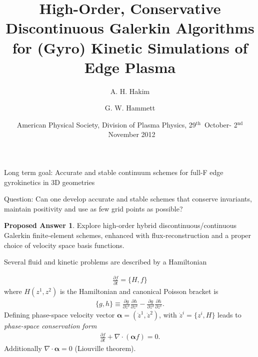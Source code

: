 \documentclass[pdf]{beamer}
\title[Continuum Discontinuous Galerkin Algorithms]{High-Order,
  Conservative Discontinuous Galerkin Algorithms for (Gyro) Kinetic
  Simulations of Edge Plasma}%
\author{A. H. Hakim \and G. W. Hammett}%
\institute[http://www.ammar-hakim.org/sj] %
{
  Princeton Plasma Physics Laboratory, Princeton, NJ\\
  ammar@princeton.edu\\
  \url{http://www.ammar-hakim.org}
}
\date[APS/DPP 2012]{American Physical Society, Division of Plasma
  Physics, 29$^\mathrm{th}$~October- 2$^\mathrm{nd}$~November 2012}
\newcommand{\pfrac}[2]{\frac{\partial #1}{\partial #2}}
\newcommand{\gvec}[1]{\boldsymbol{#1}}
\theoremstyle{definition}
\newtheorem{proposed}{Proposed Answer}
\begin{document}
\begin{frame}
  \titlepage
\end{frame}

\begin{frame}{Long term goal: Accurate and stable continuum schemes
    for full-F edge gyrokinetics in 3D geometries}

  Question: Can one develop accurate and stable schemes that conserve
  invariants, maintain positivity and use as few grid points as
  possible?

  \begin{proposed}
    Explore high-order hybrid discontinuous/continuous Galerkin
    finite-element schemes, enhanced with flux-reconstruction and a
    proper choice of velocity space basis functions.
  \end{proposed}

\end{frame}

\begin{frame}{Several fluid and kinetic problems are described by a
    Hamiltonian}%

  \begin{align*}
    \pfrac{f}{t} = \{H,f\}
  \end{align*}
  where $H(z^1,z^2)$ is the Hamiltonian and canonical Poisson bracket
  is
  \begin{align*}
    \{g,h\} \equiv \pfrac{g}{z^1}\pfrac{h}{z^2} -
    \pfrac{g}{z^2}\pfrac{h}{z^1}.
  \end{align*}
  Defining phase-space velocity vector $\gvec{\alpha} = (\dot{z}^1,
  \dot{z}^2)$, with $\dot{z}^i = \{z^i,H\}$ leads to \emph{phase-space
    conservation form}
  \begin{align*}
    \pfrac{f}{t} + \nabla\cdot\left(\gvec{\alpha}f\right) = 0.
  \end{align*}
  Additionally $\nabla\cdot\gvec{\alpha} = 0$ (Liouville theorem).
\end{frame}
\end{document}

